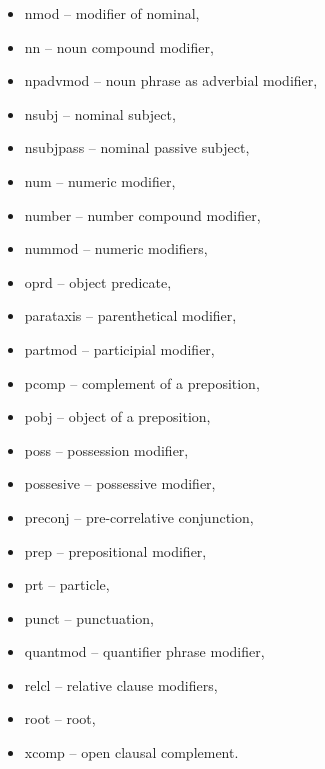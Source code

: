 \begin{itemize}
	\item nmod -- modifier of nominal,
	\item nn -- noun compound modifier,
	\item npadvmod -- noun phrase as adverbial modifier,
	\item nsubj -- nominal subject,
	\item nsubjpass -- nominal passive subject,
	\item num -- numeric modifier,
	\item number -- number compound modifier,
	\item nummod -- numeric modifiers,
	\item oprd -- object predicate,
	\item parataxis -- parenthetical modifier,
	\item partmod -- participial modifier,
	\item pcomp -- complement of a preposition,
	\item pobj -- object of a preposition,
	\item poss -- possession modifier,
	\item possesive -- possessive modifier,
	\item preconj -- pre-correlative conjunction,
	\item prep -- prepositional modifier,
	\item prt -- particle,
	\item punct -- punctuation,
	\item quantmod -- quantifier phrase modifier,
	\item relcl -- relative clause modifiers,
	\item root -- root,
	\item xcomp -- open clausal complement.
\end{itemize}